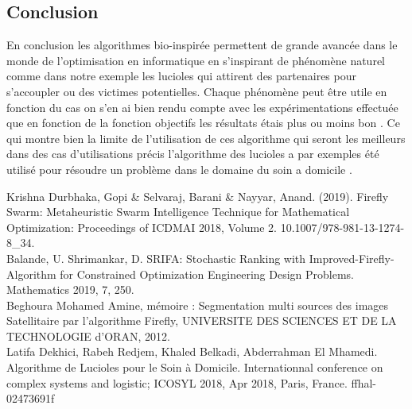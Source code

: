 \documentclass[conference]{IEEEtran}
\begin{document}
\subsection{Conclusion}
En conclusion les algorithmes bio-inspirée permettent de grande avancée dans le monde de l'optimisation en informatique en s'inspirant de phénomène naturel comme dans notre exemple les lucioles qui attirent des partenaires pour s’accoupler ou des victimes potentielles. Chaque phénomène peut être utile en fonction du cas on s'en ai bien rendu compte avec les expérimentations effectuée que en fonction de la fonction objectifs les résultats étais plus ou moins bon . Ce qui montre bien la limite de l'utilisation de ces algorithme qui seront les meilleurs dans des cas d'utilisations précis  l'algorithme des lucioles a par exemples été utilisé pour résoudre un problème dans le domaine du soin a domicile \cite{b4}. 











\begin{thebibliography}{00}
     Krishna Durbhaka, Gopi \& Selvaraj, Barani \& Nayyar, Anand. (2019). Firefly Swarm: Metaheuristic Swarm Intelligence Technique for Mathematical Optimization: Proceedings of ICDMAI 2018, Volume 2. 10.1007/978-981-13-1274-8\_34.\\
     Balande, U. Shrimankar, D. SRIFA: Stochastic Ranking with Improved-Firefly-Algorithm for Constrained Optimization Engineering Design Problems. Mathematics 2019, 7, 250.\\
     Beghoura Mohamed Amine, mémoire : Segmentation multi sources des images Satellitaire par l'algorithme Firefly, UNIVERSITE DES SCIENCES ET DE LA TECHNOLOGIE d’ORAN, 2012.\\
     Latifa Dekhici, Rabeh Redjem, Khaled Belkadi, Abderrahman El Mhamedi. Algorithme de Lucioles pour le Soin à Domicile. Internationnal conference on complex systems and logistic; ICOSYL 2018, Apr 2018, Paris, France. ffhal-02473691f\\
\end{thebibliography}
\end{document}
